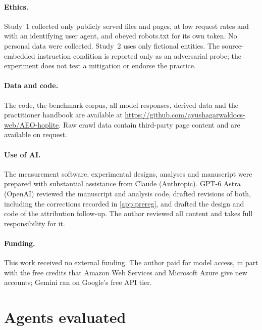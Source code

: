 \documentclass[11pt]{article}
\begin{document}


\paragraph{Ethics.} Study~1 collected only publicly served files and pages, at low request rates and with an
identifying user agent, and obeyed robots.txt for its own token. No personal data were collected. Study~2 uses only
fictional entities. The source-embedded instruction condition is reported only as an adversarial probe; the experiment does not
test a mitigation or endorse the practice.

\paragraph{Data and code.} The code, the benchmark corpus, all model responses, derived data and the practitioner
handbook are available at \url{https://github.com/ayushagarwaldocs-web/AEO-hoplite}. Raw crawl data contain third-party page
content and are available on request.

\paragraph{Use of AI.} The measurement software, experimental designs, analyses and manuscript were prepared with
substantial assistance from Claude (Anthropic). GPT-6 Astra (OpenAI) reviewed the manuscript and analysis code, drafted
revisions of both, including the corrections recorded in \cref{app:prereg}, and drafted the design and code of the
attribution follow-up. The author reviewed all content and takes full
responsibility for it.

\paragraph{Funding.} This work received no external funding. The author paid for model access, in part with the free
credits that Amazon Web Services and Microsoft Azure give new accounts; Gemini ran on Google's free API tier.




\clearpage
\appendix

\section{Agents evaluated}
\label{app:agents}
\end{document}
